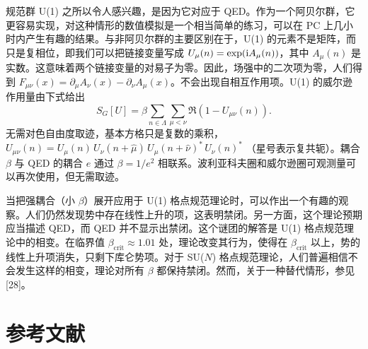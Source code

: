 规范群 U(1) 之所以令人感兴趣，是因为它对应于 QED。作为一个阿贝尔群，它更容易实现，对这种情形的数值模拟是一个相当简单的练习，可以在 PC 上几小时内产生有趣的结果。与非阿贝尔群的主要区别在于，U(1) 的元素不是矩阵，而只是复相位，即我们可以把链接变量写成 $U_\mu(n) = \exp(\mathrm{i} A_\mu(n))$，其中 $A_\mu(n)$ 是实数。这意味着两个链接变量的对易子为零。因此，场强中的二次项为零，人们得到 $F_{\mu\nu}(x) = \partial_\mu A_\nu(x) - \partial_\nu A_\mu(x)$。不会出现自相互作用项。U(1) 的威尔逊作用量由下式给出
\begin{equation}
  S_G[U] = \beta\sum_{n\in\Lambda}\sum_{\mu<\nu}
    \Re\!\left(1 - U_{\mu\nu}(n)\right) .
\end{equation}
无需对色自由度取迹，基本方格只是复数的乘积，
$U_{\mu\nu}(n) = U_\mu(n)\,U_\nu(n+\hat\mu)\,U_\mu(n+\hat\nu)^*\,U_\nu(n)^*$
（星号表示复共轭）。耦合 $\beta$ 与 QED 的耦合 $e$ 通过 $\beta = 1/e^2$ 相联系。波利亚科夫圈和威尔逊圈可观测量可以再次使用，但无需取迹。

当把强耦合（小 $\beta$）展开应用于 U(1) 格点规范理论时，可以作出一个有趣的观察。人们仍然发现势中存在线性上升的项，这表明禁闭。另一方面，这个理论预期应当描述 QED，而 QED 并不显示出禁闭。这个谜团的解答是 U(1) 格点规范理论中的相变。在临界值 $\beta_{\mathrm{crit}} \approx 1.01$ 处，理论改变其行为，使得在 $\beta_{\mathrm{crit}}$ 以上，势的线性上升项消失，只剩下库仑势项。对于 SU($N$) 格点规范理论，人们普遍相信不会发生这样的相变，理论对所有 $\beta$ 都保持禁闭。然而，关于一种替代情形，参见 [28]。

\section*{参考文献}

